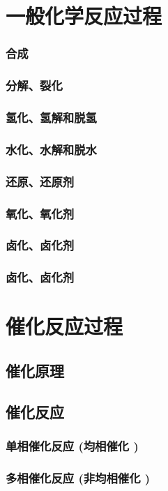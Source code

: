 \documentclass[UTF8]{../03-Chemistry}
\begin{document}
\section{一般化学反应过程}
    \subsubsection{合成}
    \subsubsection{分解、裂化}
    \subsubsection{氢化、氢解和脱氢}
    \subsubsection{水化、水解和脱水}
    \subsubsection{还原、还原剂}
    \subsubsection{氧化、氧化剂}
    \subsubsection{卤化、卤化剂}
    \subsubsection{卤化、卤化剂}

\section{催化反应过程}
    \subsection{催化原理}
    \subsection{催化反应}
        \subsubsection{单相催化反应 (均相催化 )}
        \subsubsection{多相催化反应 (非均相催化 )}
\end{document}
